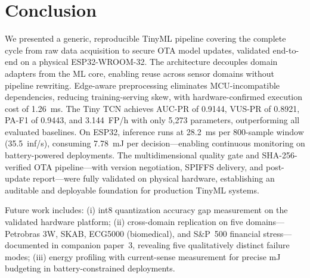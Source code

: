 \documentclass[conference]{IEEEtran}
\begin{document}
\section{Conclusion}
\label{sec:conclusion}

We presented a generic, reproducible TinyML pipeline covering the complete
cycle from raw data acquisition to secure OTA model updates, validated
end-to-end on a physical ESP32-WROOM-32.
The architecture decouples domain adapters from the ML core, enabling
reuse across sensor domains without pipeline rewriting.
Edge-aware preprocessing eliminates MCU-incompatible dependencies, reducing
training-serving skew, with hardware-confirmed execution cost of 1.26~ms.
The Tiny TCN achieves AUC-PR of 0.9144, VUS-PR of 0.8921, PA-F1 of 0.9443,
and 3.144~FP/h with only 5{,}273 parameters, outperforming all evaluated baselines.
On ESP32, inference runs at 28.2~ms per 800-sample window (35.5~inf/s),
consuming 7.78~mJ per decision---enabling continuous monitoring on
battery-powered deployments.
The multidimensional quality gate and SHA-256-verified OTA pipeline---with
version negotiation, SPIFFS delivery, and post-update report---were fully
validated on physical hardware, establishing an auditable and deployable
foundation for production TinyML systems.

Future work includes:
(i) int8 quantization accuracy gap measurement on the validated hardware platform;
(ii) cross-domain replication on five domains---Petrobras 3W, SKAB,
     ECG5000 (biomedical), and S\&P~500 financial stress---documented
     in companion paper~3, revealing five qualitatively distinct failure modes;
(iii) energy profiling with current-sense measurement for precise mJ
     budgeting in battery-constrained deployments.

\end{document}
